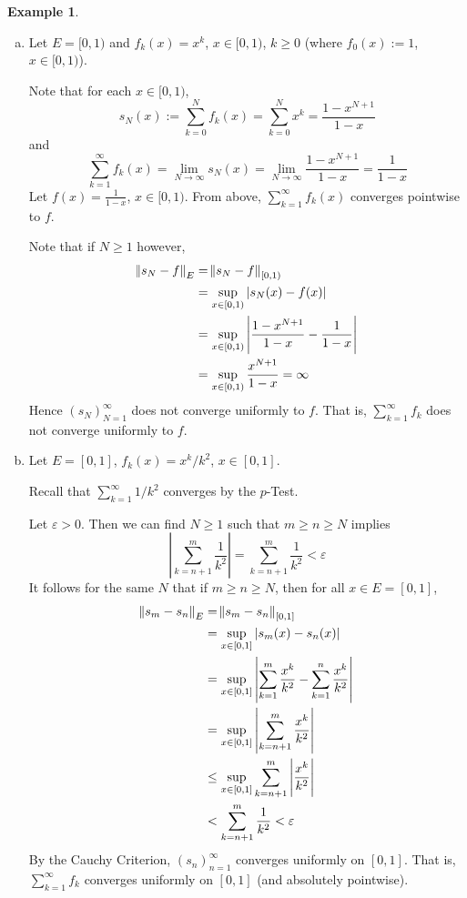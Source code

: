 \documentclass[11pt]{article}
\theoremstyle{definition}
\newtheorem{exmp}[thm]{Example}
\begin{document}
\begin{exmp}~
\begin{enumerate}[(a)] \vspace{-0.2cm}

\item Let $E = [0, 1)$ and $f_k(x) = x^k$, $x \in [0, 1)$, $k \geq 0$ (where $f_0(x) := 1$, $x \in [0, 1)$).

Note that for each $x \in [0, 1)$,
$$s_N(x) := \sum_{k=0}^N f_k(x) = \sum_{k=0}^N x^k = \frac{1 - x^{N+1}}{1 - x}$$
and
$$\sum_{k=1}^\infty f_k(x) = \lim_{N\to\infty} s_N(x) = \lim_{N\to\infty} \frac{1 - x^{N+1}}{1 - x} = \frac{1}{1 - x}$$
Let $f(x) = \frac{1}{1 - x}$, $x \in [0, 1)$. From above, $\sum_{k=1}^\infty f_k(x)$ converges pointwise to $f$. 

Note that if $N \geq 1$ however,
\begin{align*}
\norm{s_N - f}_E & = \norm{s_N - f}_{[0, 1)} \\
& = \sup_{x \in [0, 1)} |s_N(x) - f(x)| \\
& = \sup_{x \in [0, 1)} \left| \frac{1 - x^{N+1}}{1 - x} - \frac{1}{1 - x} \right| \\
& = \sup_{x \in [0, 1)} \frac{x^{N+1}}{1 - x} = \infty
\end{align*}
Hence $(s_N)_{N=1}^\infty$ does not converge uniformly to $f$. That is, $\sum_{k=1}^\infty f_k$ does not converge uniformly to $f$.

\item Let $E = [0, 1]$, $f_k(x) = x^k / k^2$, $x \in [0, 1]$. 

Recall that $\sum_{k=1}^\infty 1/k^2$ converges by the $p$-Test.

Let $\varepsilon > 0$. Then we can find $N \geq 1$ such that $m \geq n \geq N$ implies 
$$\left| \sum_{k=n+1}^m \frac{1}{k^2} \right| = \sum_{k=n+1}^m \frac{1}{k^2} < \varepsilon$$
It follows for the same $N$ that if $m \geq n \geq N$, then for all $x \in E = [0, 1]$,
\begin{align*}
\norm{s_m - s_n}_E & = \norm{s_m - s_n}_{[0, 1]} \\
& = \sup_{x \in [0, 1]} |s_m(x) - s_n(x)| \\
& = \sup_{x \in [0, 1]} \left| \sum_{k=1}^m \frac{x^k}{k^2} - \sum_{k=1}^n \frac{x^k}{k^2} \right| \\
& = \sup_{x \in [0, 1]} \left| \sum_{k=n+1}^m \frac{x^k}{k^2} \right| \\
& \leq \sup_{x \in [0, 1]} \sum_{k=n+1}^m \left| \frac{x^k}{k^2} \right| \\
& < \sum_{k=n+1}^m \frac{1}{k^2} < \varepsilon
\end{align*}
By the Cauchy Criterion, $(s_n)_{n=1}^\infty$ converges uniformly on $[0, 1]$. That is, $\sum_{k=1}^\infty f_k$ converges uniformly on $[0, 1]$ (and absolutely pointwise).


\end{enumerate}
\end{exmp}
\end{document}
